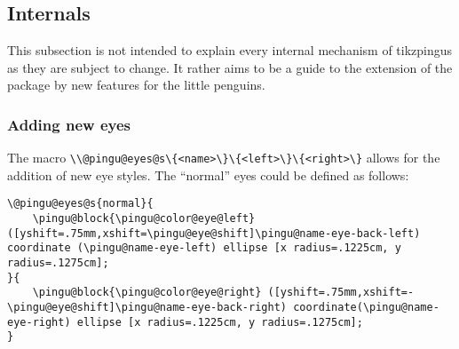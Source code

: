 \documentclass[parskip=half,english,numbers=noenddot,footnotes=nomultiple,oneside]{scrartcl}
\let\say\enquote
\def\ltex#1{\lstinline[style=lstpingu,language=pinguinternallang]'#1'}
\begin{document}
\begin{tcblisting}{}
\begin{tikzpicture}
	\pingu[second shirt, second shirt raise=5mm]
\end{tikzpicture}
\end{tcblisting}
\endsubkeyexplain

{\def\pingu@color@secondshirt{<second-shirt-color>}
\begin{tcblisting}{}
\begin{tikzpicture}
	\pingu[second shirt, second shirt neck=green]
\end{tikzpicture}
\end{tcblisting}
\endsubkeyexplain}

\subsection{Internals}
This subsection is not intended to explain every internal mechanism of tikzpingus as they are subject to change. It rather aims to be a guide to the extension of the package by new features for the little penguins.

\subsubsection{Adding new eyes}
The macro \ltex{\\@pingu@eyes@s\{<name>\}\{<left>\}\{<right>\}} allows for the addition of new eye styles.
The \say{normal} eyes could be defined as follows:
\begin{lstlisting}[style=lstpingu,language={pinguinternallang}]
\@pingu@eyes@s{normal}{
	\pingu@block{\pingu@color@eye@left} ([yshift=.75mm,xshift=\pingu@eye@shift]\pingu@name-eye-back-left) coordinate (\pingu@name-eye-left) ellipse [x radius=.1225cm, y radius=.1275cm];
}{
	\pingu@block{\pingu@color@eye@right} ([yshift=.75mm,xshift=-\pingu@eye@shift]\pingu@name-eye-back-right) coordinate(\pingu@name-eye-right) ellipse [x radius=.1225cm, y radius=.1275cm];
}
\end{lstlisting}
\printindex
\end{document}
